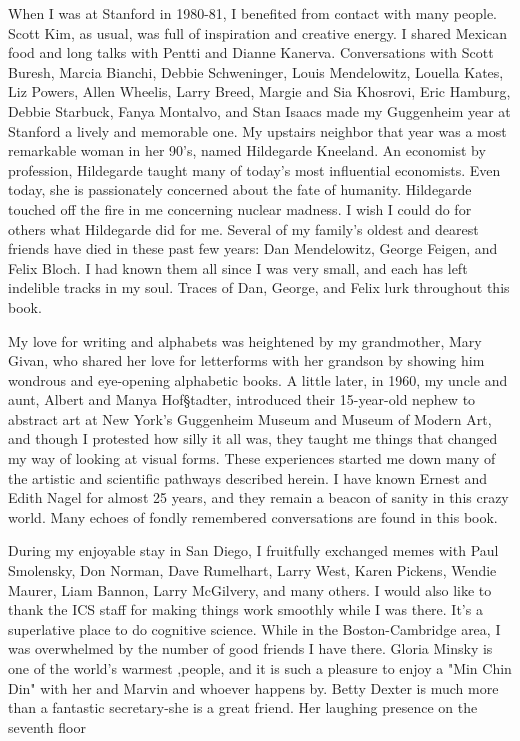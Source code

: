         When I was at Stanford in 1980-81, I benefited from contact with many
people. Scott Kim, as usual, was full of inspiration and creative energy. I shared
Mexican food and long talks with Pentti and Dianne Kanerva. Conversations with
Scott Buresh, Marcia Bianchi, Debbie Schweninger, Louis Mendelowitz, Louella
Kates, Liz Powers, Allen Wheelis, Larry Breed, Margie and Sia Khosrovi, Eric
Hamburg, Debbie Starbuck, Fanya Montalvo, and Stan Isaacs made my Guggenheim
year at Stanford a lively and memorable one.
        My upstairs neighbor that year was a most remarkable woman in her 90's,
named Hildegarde Kneeland. An economist by profession, Hildegarde taught many of
today's most influential economists. Even today, she is passionately concerned about
the fate of humanity. Hildegarde touched off the fire in me concerning nuclear
madness. I wish I could do for others what Hildegarde did for me.
        Several of my family's oldest and dearest friends have died in these past few
years: Dan Mendelowitz, George Feigen, and Felix Bloch. I had known them all since
I was very small, and each has left indelible tracks in my soul. Traces of Dan, George,
and Felix lurk throughout this book.

        My love for writing and alphabets was heightened by my grandmother, Mary
Givan, who shared her love for letterforms with her grandson by showing him
wondrous and eye-opening alphabetic books. A little later, in 1960, my uncle and
aunt, Albert and Manya Hof§tadter, introduced their 15-year-old nephew to abstract
art at New York's Guggenheim Museum and Museum of Modern Art, and though I
protested how silly it all was, they taught me things that changed my way of looking
at visual forms. These experiences started me down many of the artistic and scientific
pathways described herein.
        I have known Ernest and Edith Nagel for almost 25 years, and they remain a
beacon of sanity in this crazy world. Many echoes of fondly remembered
conversations are found in this book.

        During my enjoyable stay in San Diego, I fruitfully exchanged memes with
Paul Smolensky, Don Norman, Dave Rumelhart, Larry West, Karen Pickens, Wendie
Maurer, Liam Bannon, Larry McGilvery, and many others. I would also like to thank
the ICS staff for making things work smoothly while I was there. It's a superlative
place to do cognitive science.
        While in the Boston-Cambridge area, I was overwhelmed by the number of
good friends I have there. Gloria Minsky is one of the world's warmest ,people, and it
is such a pleasure to enjoy a "Min Chin Din" with her and Marvin and whoever
happens by. Betty Dexter is much more than a fantastic secretary-she is a great friend.
Her laughing presence on the seventh floor





